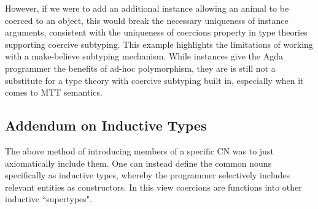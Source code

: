 However, if we were to add an additional instance allowing an animal to be
coerced to an object, this would break the necessary uniqueness of instance
arguments, consistent with the uniqueness of coercions property in type theories
supporting coercive subtyping. This example highlights the limitations of
working with a make-believe subtyping mechanism. While instances give the Agda
programmer the benefits of ad-hoc polymorphism, they are is still not a
substitute for a type theory with coercive subtyping built in, especially when
it comes to MTT semantics.

\subsection{Addendum on Inductive Types}

The above method of introducing members of a specific CN was to just
axiomatically include them. One can instead define the common nouns specifically
as inductive types, whereby the programmer selectively includes relevant
entities as constructors. In this view coercions are functions into other
inductive ``supertypes".

\begin{code}%
\>[0]\AgdaSpace{}%
\AgdaSpace{}%
\AgdaSymbol{:}\AgdaSpace{}%
\AgdaSpace{}%
\<%
\\
\>[0][@{}l@{\AgdaIndent{0}}]%
\>[2]\AgdaSpace{}%
\AgdaSpace{}%
\AgdaSymbol{:}\AgdaSpace{}%
\<%
\\
%
\\[\AgdaEmptyExtraSkip]%
\>[0]\AgdaSpace{}%
\AgdaSpace{}%
\AgdaSymbol{:}\AgdaSpace{}%
\AgdaSpace{}%
\<%
\\
\>[0][@{}l@{\AgdaIndent{0}}]%
\>[2]\AgdaSpace{}%
\AgdaSymbol{:}\AgdaSpace{}%
\<%
\\
%
\\[\AgdaEmptyExtraSkip]%
\>[0]\AgdaSpace{}%
\AgdaSpace{}%
\AgdaSymbol{:}\AgdaSpace{}%
\AgdaSpace{}%
\<%
\\
\>[0][@{}l@{\AgdaIndent{0}}]%
\>[2]\AgdaSpace{}%
\AgdaSymbol{:}\AgdaSpace{}%
\AgdaSpace{}%
\AgdaSpace{}%
\<%
\\
%
\>[2]\AgdaSpace{}%
\AgdaSymbol{:}\AgdaSpace{}%
\AgdaSpace{}%
\AgdaSpace{}%
\<%
\end{code}

